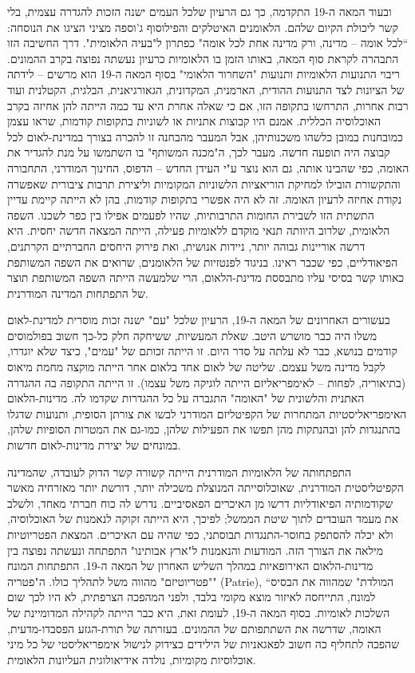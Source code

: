 ובעוד המאה ה-19 התקדמה, כך גם הרעיון שלכל העמים ישנה הזכות להגדרה עצמית, בלי קשר ליכולת הקיום שלהם. הלאומנים האיטלקים והפילוסוף ג'וספה מציני הציגו את הנוסחה: “לכל אומה – מדינה, ורק מדינה אחת לכל אומה" כפתרון ל"בעיה הלאומית". דרך החשיבה הזו התבהרה לקראת סוף המאה, באותו הזמן בו הלאומיות כרעיון נעשתה נפוצה בקרב ההמונים. ריבוי התנועות הלאומיות ותנועות "השחרור הלאומי" בסוף המאה ה-19 הוא מרשים – לידתה של הציונות לצד התנועות ההודית, הארמנית, המקדונית, הגאורגיאנית, הבלגית, הקטלנית ועוד רבות אחרות, התרחשו בתקופה הזו, אם כי שאלה אחרת היא עד כמה הייתה להן אחיזה בקרב האוכלוסיה הכללית. אמנם היו קבוצות אתניות או לשוניות בתקופות קודמות, שראו עצמן כמובחנות במובן כלשהו משכנותיהן, אבל המעבר מהבחנה זו להכרה בצורך במדינת-לאום לכל קבוצה היה תופעה חדשה. מעבר לכך, ה"מכנה המשותף" בו השתמשו על מנת להגדיר את האומה, כפי שהבינו אותה, גם הוא נוצר ע"י העידן החדש – הדפוס, החינוך המודרני, התחבורה והתקשורת הובילו למחיקת הוריאציות הלשוניות המקומיות וליצירת תרבות ציבורית שאפשרה נקודת אחיזה לרעיון האומה. זה לא היה אפשרי בתקופות קודמות, בהן לא הייתה קיימת עדיין התשתית הזו לשבירת החומות התרבותיות, שהיו לפעמים אפילו בין כפר לשכנו. השפה הלאומית, שלרוב היוותה תנאי מוקדם ללאומיות פעילה, הייתה המצאה חדשה יחסית. היא דרשה אוריינות גבוהה יותר, ניידות אנושית, ואת פירוק היחסים החברתיים הקרתנים, הפיאודליים, כפי שכבר ראינו. בניגוד לפנטזיות של הלאומנים, שרואים את השפה המשותפת כאותו קשר בסיסי עליו מתבססת מדינת-הלאום, הרי שלמעשה הייתה השפה המשותפת תוצר של התפתחות המדינה המודרנית.

בעשורים האחרונים של המאה ה-19, הרעיון שלכל "עם" ישנה זכות מוסרית למדינת-לאום משלו היה כבר מושרש היטב. שאלת המעשיות, ששיחקה חלק כל-כך חשוב בפולמוסים קודמים בנושא, כבר לא עלתה על סדר היום. זו הייתה זכותם של "עמים", כיצד שלא יוגדרו, לקבל מדינה משל עצמם. שליטה של לאום אחד בלאום אחר הייתה מוקצה מחמת מיאוס (בתיאוריה, לפחות – לאימפריאליזם הייתה לוגיקה משל עצמו). זו הייתה התקופה בה ההגדרה האתנית והלשונית של "האומה" התגברה על כל ההגדרות שקדמו לה. מדינות-הלאום האימפריאליסטיות המתחרות של הקפיטליזם המודרני לבשו את צורתן הסופית, ותנועות שדגלו בהתנגדות להן ובהנתקות מהן תפשו את הפעילות שלהן, כמו-גם את המטרות הסופיות שלהן, במונחים של יצירת מדינות-לאום חדשות.

התפתחותה של הלאומיות המודרנית הייתה קשורה קשר הדוק לעובדה, שהמדינה הקפיטליסטית המודרנית, שאוכלוסייתה המנוצלת משכילה יותר, דורשת יותר מאזרחיה מאשר שקודמותיה הפיאודליות דרשו מן האיכרים הפאסיביים. נדרש לה כוח חברתי מאחד, ולשלב את מעמד העובדים לתוך שיטת הממשל; לפיכך, היא הייתה זקוקה לנאמנות של האוכלוסיה, ולא יכלה להסתפק בחוסר-התנגדות תבוסתני, כפי שהיה עם האיכרים. המצאת הפטריוטיות מילאה את הצורך הזה. המודעות והנאמנות ל"ארץ אבותינו" התפתחה ונעשתה נפוצה בין מדינות-הלאום האירופאיות במהלך השליש האחרון של המאה ה-19. התפתחות המונח "פטריוטיזם" מהווה משל לתהליך כולו. ה"פטריה" (Patrie), “המולדת" שמהווה את הבסיס למונח, התייחסה לאיזור מוצא מקומי בלבד, ולפני המהפכה הצרפתית, לא היו לכך שום השלכות לאומיות. בסוף המאה ה-19, לעומת זאת, היא כבר הייתה לקהילה המדומיינת של האומה, שדרשה את השתתפותם של ההמונים. בעזרתה של תורת-הגזע הפסבדו-מדעית, שהפכה לתחליף כה חשוב לפאגאניות של הילידים כצידוק לנישול אימפריאליסטי של כל מיני אוכלוסיות מקומיות, נולדה אידיאולוגית העליונות הלאומית.

